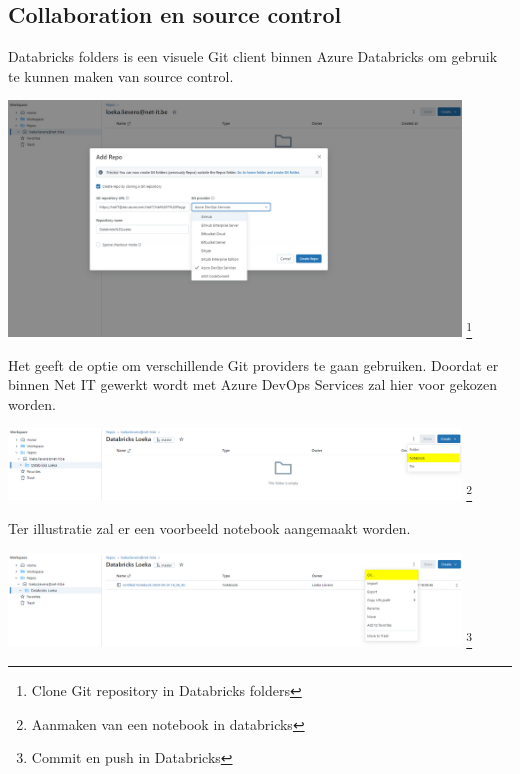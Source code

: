 \subsection{Collaboration en source control}

Databricks folders is een visuele Git client binnen Azure Databricks om gebruik te kunnen maken van source control.

\begin{center}
    \includegraphics[width=0.9\textwidth]{./graphics/databricks/git_1.png}
    \footnote{Clone Git repository in Databricks folders}
\end{center}

Het geeft de optie om verschillende Git providers te gaan gebruiken. Doordat er binnen Net IT gewerkt wordt met Azure DevOps Services zal hier voor gekozen worden.

\begin{center}
    \includegraphics[width=0.9\textwidth]{./graphics/databricks/git_2.png}
    \footnote{Aanmaken van een notebook in databricks}
\end{center}

Ter illustratie zal er een voorbeeld notebook aangemaakt worden.

\begin{center}
    \includegraphics[width=0.9\textwidth]{./graphics/databricks/git_3.png}
    \footnote{Commit en push in Databricks}
\end{center}

